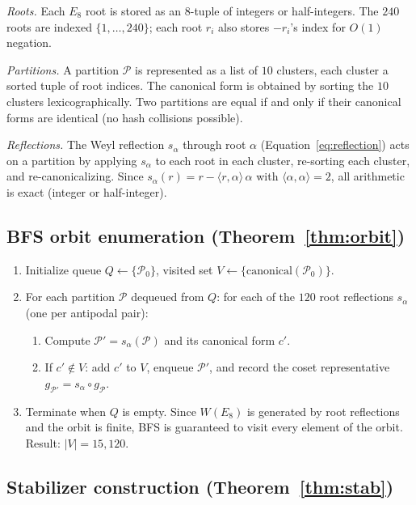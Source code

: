 \documentclass[11pt,reqno]{amsart}
\theoremstyle{plain}
\theoremstyle{definition}
\theoremstyle{remark}
\begin{document}
\emph{Roots.}
Each $E_8$ root is stored as an $8$-tuple of integers or
half-integers.
The $240$ roots are indexed $\{1,\ldots,240\}$; each root
$r_i$ also stores $-r_i$'s index for $O(1)$ negation.

\emph{Partitions.}
A partition $\mathcal{P}$ is represented as a list of $10$
clusters, each cluster a sorted tuple of root indices.
The canonical form is obtained by sorting the $10$ clusters
lexicographically.
Two partitions are equal if and only if their canonical
forms are identical (no hash collisions possible).

\emph{Reflections.}
The Weyl reflection $s_\alpha$ through root $\alpha$
(Equation~\ref{eq:reflection}) acts on a partition by
applying $s_\alpha$ to each root in each cluster, re-sorting
each cluster, and re-canonicalizing.
Since $s_\alpha(r) = r - \langle r,\alpha\rangle\,\alpha$
with $\langle\alpha,\alpha\rangle = 2$, all arithmetic is
exact (integer or half-integer).

\subsection{BFS orbit enumeration (Theorem~\ref{thm:orbit})}

\begin{enumerate}
\item Initialize queue $Q \gets \{\mathcal{P}_0\}$,
  visited set $V \gets \{\text{canonical}(\mathcal{P}_0)\}$.
\item For each partition $\mathcal{P}$ dequeued from $Q$:
  for each of the $120$ root reflections
  $s_\alpha$ (one per antipodal pair):
  \begin{enumerate}
  \item Compute $\mathcal{P}' = s_\alpha(\mathcal{P})$
    and its canonical form $c'$.
  \item If $c' \notin V$: add $c'$ to $V$, enqueue
    $\mathcal{P}'$, and record the coset representative
    $g_{\mathcal{P}'} = s_\alpha \circ g_{\mathcal{P}}$.
  \end{enumerate}
\item Terminate when $Q$ is empty.
  Since $W(E_8)$ is generated by root reflections and the
  orbit is finite, BFS is guaranteed to visit every element
  of the orbit.
  Result: $|V| = 15{,}120$.
\end{enumerate}

\subsection{Stabilizer construction (Theorem~\ref{thm:stab})}
\end{document}
